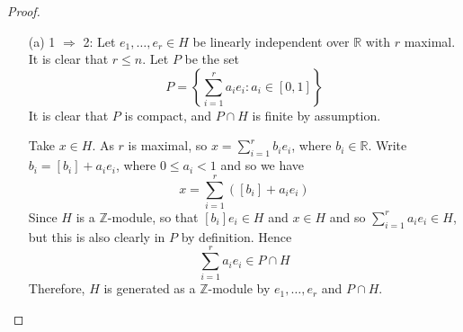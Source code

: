 \begin{proof}
\begin{enumerate}
\item[(a)] 1 $\Rightarrow$ 2: Let $e_1,\ldots,e_r \in H$ be linearly independent over $\mathbb{R}$ with $r$ maximal.
It is clear that $r \le n$. Let $P$ be the set
$$P=\left\{\sum_{i=1}^r a_ie_i: a_i \in [0,1]\right\}$$ It is clear that $P$ is compact, and $P \cap H$ is finite by assumption.

Take $x \in H$. As $r$ is maximal, so $x=\sum_{i=1}^r b_i e_i$, where $b_i \in \mathbb{R}$.
Write $b_i=[b_i]+a_i e_i$, where $0 \le a_i <1$ and so we have
$$x=\sum_{i=1}^r \left([b_i]+a_ie_i\right)$$
Since $H$ is a $\mathbb{Z}$-module, so that $[b_i]e_i \in H$ and $x \in H$ and so
$\sum_{i=1}^r a_ie_i \in H$, but this is also clearly in $P$ by definition. Hence
$$\sum_{i=1}^r a_ie_i \in P \cap H$$
Therefore, $H$ is generated as a $\mathbb{Z}$-module by $e_1,\ldots,e_r$ and $P \cap H$.


\end{enumerate}
\end{proof}
